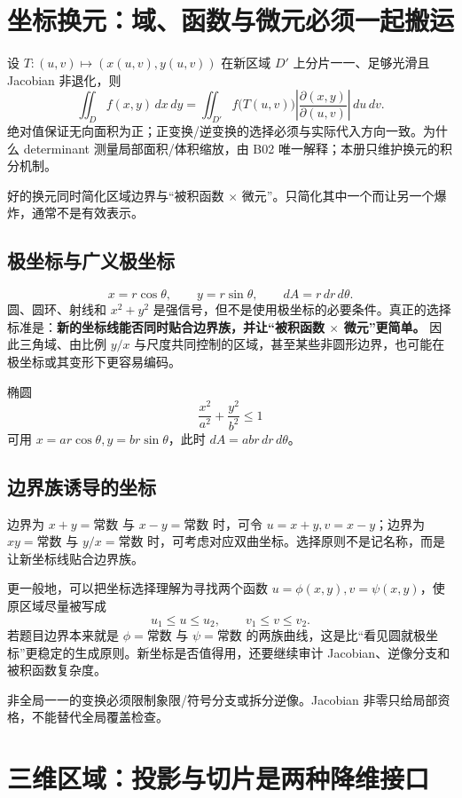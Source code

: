 \documentclass[11pt,a4paper,fontset=fandol]{ctexart}
\begin{document}
\section{坐标换元：域、函数与微元必须一起搬运}

设 $T:(u,v)\mapsto(x(u,v),y(u,v))$ 在新区域 $D'$ 上分片一一、足够光滑且 Jacobian 非退化，则
\[
\boxed{
\iint_D f(x,y)\,dx\,dy
=\iint_{D'}f\bigl(T(u,v)\bigr)
\left\lvert\frac{\partial(x,y)}{\partial(u,v)}\right\rvert\,du\,dv.}
\]
绝对值保证无向面积为正；正变换/逆变换的选择必须与实际代入方向一致。为什么 determinant 测量局部面积/体积缩放，由 B02 唯一解释；本册只维护换元的积分机制。

好的换元同时简化区域边界与“被积函数 $\times$ 微元”。只简化其中一个而让另一个爆炸，通常不是有效表示。

\subsection{极坐标与广义极坐标}
\[
x=r\cos\theta,\qquad y=r\sin\theta,
\qquad dA=r\,dr\,d\theta.
\]
圆、圆环、射线和 $x^2+y^2$ 是强信号，但不是使用极坐标的必要条件。真正的选择标准是：\textbf{新的坐标线能否同时贴合边界族，并让“被积函数 $\times$ 微元”更简单。} 因此三角域、由比例 $y/x$ 与尺度共同控制的区域，甚至某些非圆形边界，也可能在极坐标或其变形下更容易编码。

椭圆
\[
\frac{x^2}{a^2}+\frac{y^2}{b^2}\le1
\]
可用 $x=ar\cos\theta,y=br\sin\theta$，此时 $dA=ab r\,dr\,d\theta$。

\subsection{边界族诱导的坐标}

边界为 $x+y=\text{常数}$ 与 $x-y=\text{常数}$ 时，可令 $u=x+y,v=x-y$；边界为 $xy=\text{常数}$ 与 $y/x=\text{常数}$ 时，可考虑对应双曲坐标。选择原则不是记名称，而是让新坐标线贴合边界族。

更一般地，可以把坐标选择理解为寻找两个函数 $u=\phi(x,y),v=\psi(x,y)$，使原区域尽量被写成
\[
u_1\le u\le u_2,\qquad v_1\le v\le v_2.
\]
若题目边界本来就是 $\phi=\text{常数}$ 与 $\psi=\text{常数}$ 的两族曲线，这是比“看见圆就极坐标”更稳定的生成原则。新坐标是否值得用，还要继续审计 Jacobian、逆像分支和被积函数复杂度。

非全局一一的变换必须限制象限/符号分支或拆分逆像。Jacobian 非零只给局部资格，不能替代全局覆盖检查。

\section{三维区域：投影与切片是两种降维接口}
\end{document}
